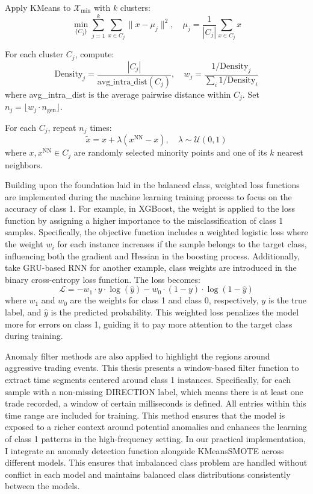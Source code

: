 Apply KMeans to $\mathcal{X}_{\text{min}}$ with $k$ clusters:
  \[
  \min_{\{C_j\}} \sum_{j=1}^k \sum_{x \in C_j} \|x - \mu_j\|^2, \quad \mu_j = \frac{1}{|C_j|} \sum_{x \in C_j} x
  \]

For each cluster $C_j$, compute:
  \[
  \text{Density}_j = \frac{|C_j|}{\text{avg\_intra\_dist}(C_j)}, \quad w_j = \frac{1/\text{Density}_j}{\sum_{i} 1/\text{Density}_i}
  \]
where avg\_intra\_dist is the average pairwise distance within $C_j$. Set $n_j = \lfloor w_j \cdot n_{\text{gen}} \rfloor$.

For each $C_j$, repeat $n_j$ times:
  \[
  \tilde{x} = x + \lambda (x^{\text{NN}} - x), \quad \lambda \sim \mathcal{U}(0, 1)
  \]
where $x, x^{\text{NN}} \in C_j$ are randomly selected minority points and one of its $k$ nearest neighbors.

Building upon the foundation laid in the balanced class, weighted loss functions are implemented during the machine learning training process to focus on the accuracy of class 1. For example, in XGBoost, the weight is applied to the loss function by assigning a higher importance to the misclassification of class 1 samples. Specifically, the objective function includes a weighted logistic loss where the weight $w_i$ for each instance increases if the sample belongs to the target class, influencing both the gradient and Hessian in the boosting process. Additionally, take GRU-based RNN for another example, class weights are introduced in the binary cross-entropy loss function. The loss becomes:
\[
\mathcal{L} = -w_1 \cdot y \cdot \log(\hat{y}) - w_0 \cdot (1 - y) \cdot \log(1 - \hat{y})
\]
where $w_1$ and $w_0$ are the weights for class 1 and class 0, respectively, $y$ is the true label, and $\hat{y}$ is the predicted probability. This weighted loss penalizes the model more for errors on class 1, guiding it to pay more attention to the target class during training.

Anomaly filter methods are also applied to highlight the regions around aggressive trading events. This thesis presents a window-based filter function to extract time segments centered around class 1 instances. Specifically, for each sample with a non-missing DIRECTION label, which means there is at least one trade recorded, a window of certain milliseconds is defined. All entries within this time range are included for training. This method ensures that the model is exposed to a richer context around potential anomalies and enhances the learning of class 1 patterns in the high-frequency setting. In our practical implementation, I integrate an anomaly detection function alongside KMeansSMOTE across different models. This ensures that imbalanced class problem are handled without conflict in each model and maintains balanced class distributions consistently between the models.

